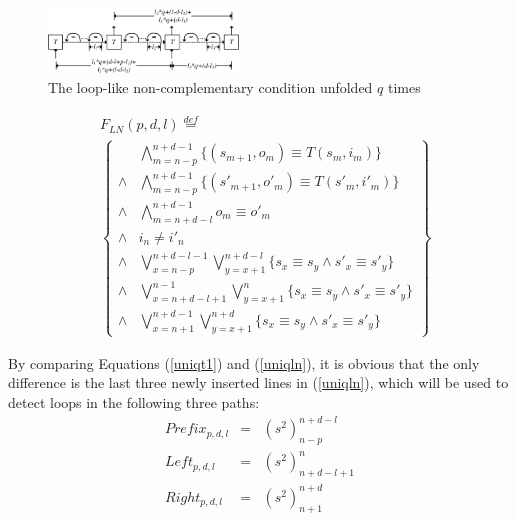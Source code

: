 \documentclass[journal]{IEEEtran}
\begin{document}
\begin{figure}[t]
\begin{center}
\includegraphics[width=0.45\textwidth]{doubleloop_unfold}
\end{center}
\caption{The loop-like non-complementary condition unfolded $q$ times}
  \label{fig_double_loop_unfold}
\end{figure}

\begin{equation}\label{uniqln}
\begin{split}
&F_{LN}(p,d,l)\overset{def}{=}\\
&\left\{
\begin{array}{cc}
&\bigwedge_{m=n-p}^{n+d-1}
\{
(s_{m+1},o_m)\equiv T(s_m,i_m)
\}
\\
\wedge&\bigwedge_{m=n-p}^{n+d-1}
\{
(s'_{m+1},o'_m)\equiv T(s'_m,i'_m)
\}
\\
\wedge&\bigwedge_{m=n+d-l}^{n+d-1}o_m\equiv o'_m \\
\wedge& i_n\ne i'_n \\
\wedge&\bigvee_{x=n-p}^{n+d-l-1}\bigvee_{y=x+1}^{n+d-l} \{s_x\equiv s_y\wedge s'_x\equiv s'_y\} \\
\wedge&\bigvee_{x=n+d-l+1}^{n-1}\bigvee_{y=x+1}^{n} \{s_x\equiv s_y\wedge s'_x\equiv s'_y\} \\
\wedge&\bigvee_{x=n+1}^{n+d-1}\bigvee_{y=x+1}^{n+d} \{s_x\equiv s_y\wedge s'_x\equiv s'_y\}
\end{array}
\right\}
\end{split}
\end{equation}

By comparing Equations (\ref{uniqt1}) and (\ref{uniqln}),
it is obvious that the only difference is the last three newly inserted lines in (\ref{uniqln}),
which will be used to detect loops in the following three paths:
\begin{equation}
\begin{array}{ccc}
Prefix_{p,d,l}&=&(s^2)_{n-p}^{n+d-l} \\
Left_{p,d,l}&=&(s^2)_{n+d-l+1}^n \\
Right_{p,d,l}&=&(s^2)_{n+1}^{n+d}
\end{array}
\end{equation}
\end{document}

